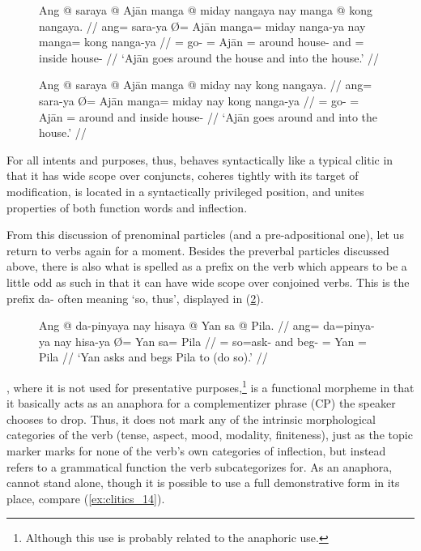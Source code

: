 \begin{figure}
\pex\label{ex:clitics_mangacoord}
\a\label{ex:clitics_mangacoord1}\begingl
	\gla Ang @ saraya {} @ Ajān manga @ miday nangaya nay manga @ kong 
		nangaya. //
	\glb ang= sara-ya Ø= Ajān manga= miday nanga-ya nay manga= kong nanga-ya //
	\glc \AgtT{}= go-\TsgM{} \Top{}= Ajān \Dir{}= around house-\Loc{} and
		\Dir{}= inside house-\Loc{} //
	\glft `Ajān goes around the house and into the house.' //
\endgl

\a\label{ex:clitics_mangacoord2}\begingl
	\gla Ang @ saraya {} @ Ajān manga @ miday nay kong nangaya. //
	\glb ang= sara-ya Ø= Ajān manga= miday nay kong nanga-ya //
	\glc \AgtT{}= go-\TsgM{} \Top{}= Ajān \Dir{}= around and inside
		house-\Loc{} //
	\glft `Ajān goes around and into the house.' //
\endgl
\xe
\end{figure}

For all intents and purposes, thus,  behaves syntactically like
a typical clitic in that it has wide scope over conjuncts, coheres tightly with
its target of modification, is located in a syntactically privileged position,
and unites properties of both function words and inflection.

\label{clitics_preverb_da}
From this discussion of prenominal particles (and a pre-adpositional one), let us
return to verbs again for a moment. Besides the preverbal particles discussed
above, there is also what is spelled as a prefix on the verb which appears to
be a little odd as such in that it can have wide scope over conjoined verbs.
This is the prefix  {da-} often meaning `so, thus', displayed in
(\ref{ex:clitics_13}).

\begin{figure}
\ex\label{ex:clitics_13}\begingl
	\gla Ang @ da-pinyaya nay hisaya {} @ Yan sa @ Pila. //
	\glb ang= da=pinya-ya nay hisa-ya Ø= Yan sa= Pila //
	\glc \AgtT{}= so=ask-\TsgM{} and beg-\TsgM{} \Top{}= Yan \Parg{}= Pila //
	\glft `Yan asks and begs Pila to (do so).' //
\endgl\xe
\end{figure}

, where it is not used for presentative 
purposes,\footnote{Although this use is probably related to the anaphoric use.}
is a functional morpheme in that it basically acts as an anaphora for a
complementizer phrase (CP) the speaker chooses to drop. Thus, it does not mark
any of the intrinsic morphological categories of the verb (tense, aspect, mood,
modality, finiteness), just as the topic marker marks for none of the verb's
own categories of inflection, but instead refers to a grammatical function the
verb subcategorizes for. As an anaphora,  cannot stand alone,
though it is possible to use a full demonstrative form  in its place, compare (\ref{ex:clitics_14}).

